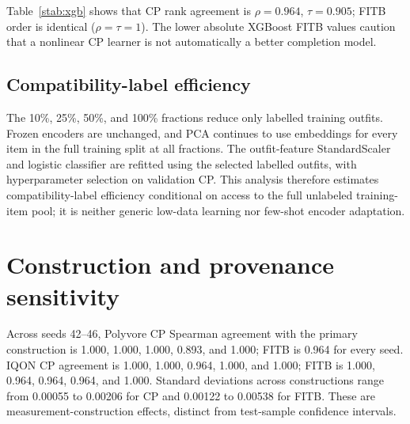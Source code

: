 \documentclass[pdflatex,sn-mathphys-num,iicol]{sn-jnl}
\begin{document}
\begin{table}[t]
\caption{IQON logistic versus XGBoost robustness over the same PCA-256 outfit features.}
\label{stab:xgb}
\centering\small
{}
\end{table}

Table~\ref{stab:xgb} shows that CP rank agreement is $\rho=0.964$, $\tau=0.905$; FITB order is identical ($\rho=\tau=1$). The lower absolute XGBoost FITB values caution that a nonlinear CP learner is not automatically a better completion model.

\subsection{Compatibility-label efficiency}

The 10\%, 25\%, 50\%, and 100\% fractions reduce only labelled training outfits. Frozen encoders are unchanged, and PCA continues to use embeddings for every item in the full training split at all fractions. The outfit-feature StandardScaler and logistic classifier are refitted using the selected labelled outfits, with hyperparameter selection on validation CP. This analysis therefore estimates compatibility-label efficiency conditional on access to the full unlabeled training-item pool; it is neither generic low-data learning nor few-shot encoder adaptation.

\section{Construction and provenance sensitivity}

Across seeds 42--46, Polyvore CP Spearman agreement with the primary construction is 1.000, 1.000, 1.000, 0.893, and 1.000; FITB is 0.964 for every seed. IQON CP agreement is 1.000, 1.000, 0.964, 1.000, and 1.000; FITB is 1.000, 0.964, 0.964, 0.964, and 1.000. Standard deviations across constructions range from 0.00055 to 0.00206 for CP and 0.00122 to 0.00538 for FITB. These are measurement-construction effects, distinct from test-sample confidence intervals.
\end{document}
